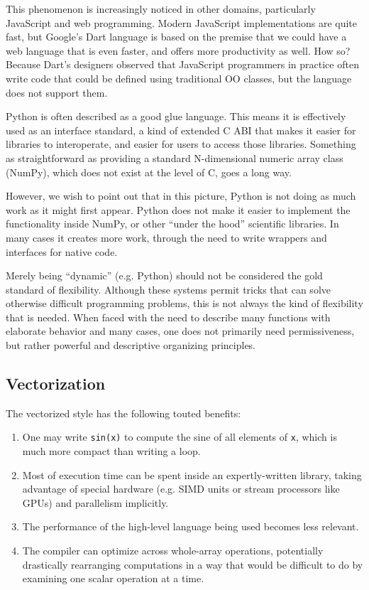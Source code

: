 {This phenomenon is increasingly noticed in other domains, particularly
JavaScript and web programming. Modern JavaScript implementations are
quite fast, but Google's Dart language is based on the premise that
we could have a web language that is even faster, and offers more
productivity as well. How so? Because Dart's designers observed that
JavaScript programmers in practice often write code that could be
defined using traditional OO classes, but the language does not
support them.

Python is often described as a good glue language. This
means it is effectively used as an interface standard, a kind of
extended C ABI that makes it easier for libraries to interoperate,
and easier for users to access those libraries. Something as straightforward
as providing a standard N-dimensional numeric array class (NumPy),
which does not exist at the level of C, goes a long way.

However, we wish to point out that in this picture, Python is not
doing as much work as it might first appear. Python does not make
it easier to implement the functionality inside NumPy, or other
``under the hood'' scientific libraries. In many cases it creates
more work, through the need to write wrappers and interfaces
for native code.

Merely being ``dynamic'' (e.g. Python) should not be considered
the gold standard of flexibility. Although these systems permit
tricks that can solve otherwise difficult programming problems,
this is not always the kind of flexibility that is needed.
When faced with the need to describe many functions with elaborate
behavior and many cases, one does not primarily need permissiveness,
but rather powerful and descriptive organizing principles.

\subsection{Vectorization}

The vectorized style has the following touted benefits:

\begin{enumerate}
\item One may write \texttt{sin(x)} to compute the sine of
all elements of \texttt{x}, which is much more compact than writing a loop.
\item Most of execution time can be spent inside an expertly-written library,
taking advantage of special hardware (e.g. SIMD units or stream processors
like GPUs) and parallelism implicitly.
\item The performance of the high-level language being used becomes less
relevant.
\item The compiler can optimize across whole-array operations, potentially
drastically rearranging computations in a way that would be difficult to do
by examining one scalar operation at a time.
\end{enumerate}

}
